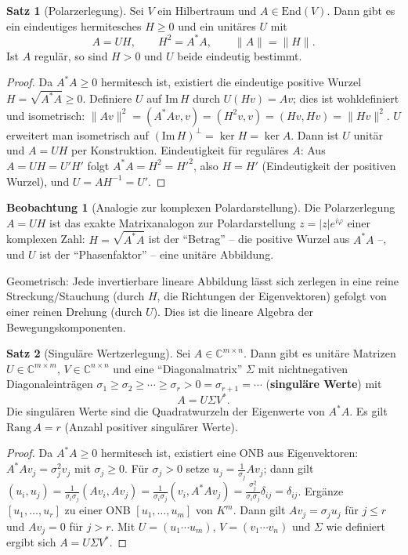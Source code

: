 ﻿\documentclass[a4paper,12pt]{report}
\theoremstyle{definition}
\newtheorem{satz}{Satz}
\newtheorem{beobachtung}{Beobachtung}
\begin{document}
\begin{satz}[Polarzerlegung]
    Sei $V$ ein Hilbertraum und $A \in \mathrm{End}(V)$. Dann gibt es
    ein eindeutiges hermitesches $H \geq 0$ und ein unitäres $U$ mit
    \[
        A = UH, \qquad H^2 = A^*A, \qquad \|A\| = \|H\|.
    \]
    Ist $A$ regulär, so sind $H > 0$ und $U$ beide eindeutig bestimmt.
\end{satz}
\begin{proof}
    Da $A^*A \geq 0$ hermitesch ist, existiert die eindeutige positive Wurzel
    $H = \sqrt{A^*A} \geq 0$. Definiere $U$ auf $\mathrm{Im}\, H$ durch $U(Hv) = Av$;
    dies ist wohldefiniert und isometrisch:
    $\|Av\|^2 = (A^*Av, v) = (H^2 v, v) = (Hv, Hv) = \|Hv\|^2$.
    $U$ erweitert man isometrisch auf $(\mathrm{Im}\, H)^\perp = \ker H = \ker A$.
    Dann ist $U$ unitär und $A = UH$ per Konstruktion.
    Eindeutigkeit für reguläres $A$: Aus $A = UH = U'H'$ folgt
    $A^*A = H^2 = H'^2$, also $H = H'$ (Eindeutigkeit der positiven Wurzel),
    und $U = AH^{-1} = U'$.
\end{proof}


\begin{beobachtung}[Analogie zur komplexen Polardarstellung]
    Die Polarzerlegung $A = UH$ ist das exakte Matrixanalogon zur
    Polardarstellung $z = |z| e^{i\varphi}$ einer komplexen Zahl:
    $H = \sqrt{A^*A}$ ist der ``Betrag'' -- die positive
    Wurzel aus $A^*A$ --, und $U$ ist der ``Phasenfaktor'' --
    eine unitäre Abbildung.

    Geometrisch: Jede invertierbare lineare Abbildung lässt sich
    zerlegen in eine reine Streckung/Stauchung (durch $H$, die
    Richtungen der Eigenvektoren) gefolgt von einer reinen Drehung
    (durch $U$). Dies ist die lineare Algebra der Bewegungskomponenten.
\end{beobachtung}

\begin{satz}[Singuläre Wertzerlegung]
    Sei $A \in \mathbb{C}^{m \times n}$. Dann gibt es unitäre Matrizen
    $U \in \mathbb{C}^{m \times m}$, $V \in \mathbb{C}^{n \times n}$ und
    eine ``Diagonalmatrix'' $\Sigma$ mit nichtnegativen Diagonaleinträgen
    $\sigma_1 \geq \sigma_2 \geq \cdots \geq \sigma_r > 0 = \sigma_{r+1} = \cdots$
    (\textbf{singuläre Werte}) mit
    \[
        A = U \Sigma V^*.
    \]
    Die singulären Werte sind die Quadratwurzeln der Eigenwerte von $A^*A$.
    Es gilt $\mathrm{Rang}\, A = r$ (Anzahl positiver singulärer Werte).
\end{satz}
\begin{proof}
    Da $A^*A \geq 0$ hermitesch ist, existiert eine ONB
    aus Eigenvektoren: $A^*A v_j = \sigma_j^2 v_j$ mit $\sigma_j \geq 0$.
    Für $\sigma_j > 0$ setze $u_j = \frac{1}{\sigma_j} A v_j$; dann gilt
    $(u_i, u_j) = \tfrac{1}{\sigma_i \sigma_j}(Av_i, Av_j) = \tfrac{1}{\sigma_i \sigma_j}
    (v_i, A^*Av_j) = \frac{\sigma_j^2}{\sigma_i \sigma_j} \delta_{ij} = \delta_{ij}$.
    Ergänze $[u_1, \ldots, u_r]$ zu einer ONB $[u_1, \ldots, u_m]$ von $K^m$.
    Dann gilt $A v_j = \sigma_j u_j$ für $j \leq r$ und $A v_j = 0$ für $j > r$.
    Mit $U = (u_1 \cdots u_m)$, $V = (v_1 \cdots v_n)$ und $\Sigma$ wie definiert
    ergibt sich $A = U \Sigma V^*$.
\end{proof}
\end{document}
